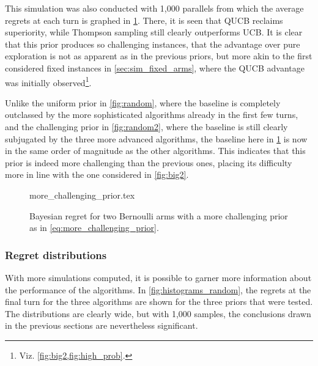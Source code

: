 This simulation was also conducted with 1,000 parallels from which the average regrets at each turn is graphed in \cref{fig:random3}.
There, it is seen that QUCB reclaims superiority, while Thompson sampling still clearly outperforms UCB.
It is clear that this prior produces so challenging instances, that the advantage over pure exploration is not as apparent as in the previous priors, but more akin to the first considered fixed instances in \cref{sec:sim_fixed_arms}, where the QUCB advantage was initially observed\footnote{Viz. \cref{fig:big2,fig:high_prob}.}.

Unlike the uniform prior in \cref{fig:random}, where the baseline is completely outclassed by the more sophisticated algorithms already in the first few turns, and the challenging prior in \cref{fig:random2}, where the baseline is still clearly subjugated by the three more advanced algorithms, the baseline here in \cref{fig:random3} is now in the same order of magnitude as the other algorithms.
This indicates that this prior is indeed more challenging than the previous ones, placing its difficulty more in line with the one considered in \cref{fig:big2}.


\begin{figure}[p]
    \centering
    \newcommand{\myoptions}{
        width=10cm,
        height=8cm,
        xlabel={Kiloturn},
        ylabel={Regret},
        legend entries={Baseline, UCB, QUCB, Thompson},
        legend pos=north west,
        legend cell align=left,
        mystyle,
    }
    {more_challenging_prior.tex}
    \caption[
        Bayesian regret for two Bernoulli arms, more challenging prior.
    ]
    {
        Bayesian regret for two Bernoulli arms with a more challenging prior as in \cref{eq:more_challenging_prior}.
    }
    \label{fig:random3}
\end{figure}

\pagebreak\clearpage

\vspace*{0cm}
\subsubsection{Regret distributions}
With more simulations computed, it is possible to garner more information about the performance of the algorithms.
In \cref{fig:histograms_random}, the regrets at the final turn for the three algorithms are shown for the three priors that were tested.
The distributions are clearly wide, but with 1,000 samples, the conclusions drawn in the previous sections are nevertheless significant.

